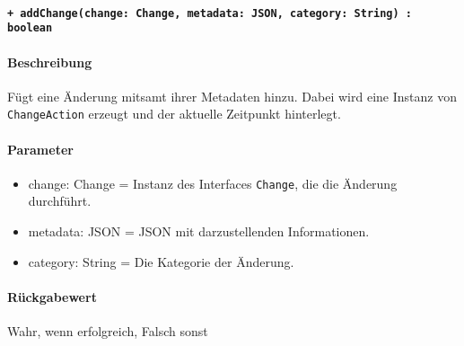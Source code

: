 \paragraph{\texttt{+ addChange(change: Change, metadata: JSON, category: String) : boolean}}%
\paragraph*{Beschreibung}
Fügt eine Änderung mitsamt ihrer Metadaten hinzu.
Dabei wird eine Instanz von \verb#ChangeAction# erzeugt und der aktuelle Zeitpunkt hinterlegt.
\paragraph*{Parameter}
\begin{itemize}
    \item change: Change = Instanz des Interfaces \verb#Change#, die die Änderung durchführt.
    \item metadata: JSON = JSON mit darzustellenden Informationen.
    \item category: String = Die Kategorie der Änderung.
\end{itemize}
\paragraph*{Rückgabewert}
Wahr, wenn erfolgreich, Falsch sonst
